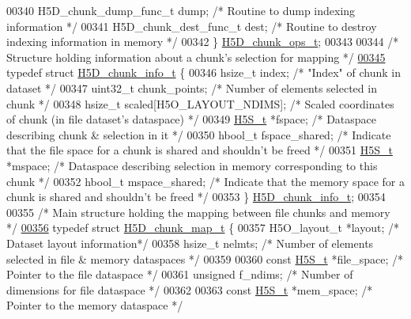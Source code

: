 \begin{DoxyCode}
00340     H5D\_chunk\_dump\_func\_t dump;             \textcolor{comment}{/* Routine to dump indexing information */}
00341     H5D\_chunk\_dest\_func\_t dest;             \textcolor{comment}{/* Routine to destroy indexing information in memory */}
00342 \} \hyperlink{struct_h5_d__chunk__ops__t}{H5D\_chunk\_ops\_t};
00343 
00344 \textcolor{comment}{/* Structure holding information about a chunk's selection for mapping */}
\hyperlink{struct_h5_d__chunk__info__t}{00345} \textcolor{keyword}{typedef} \textcolor{keyword}{struct }\hyperlink{struct_h5_d__chunk__info__t}{H5D\_chunk\_info\_t} \{
00346     hsize\_t index;              \textcolor{comment}{/* "Index" of chunk in dataset */}
00347     uint32\_t chunk\_points;      \textcolor{comment}{/* Number of elements selected in chunk */}
00348     hsize\_t scaled[H5O\_LAYOUT\_NDIMS];   \textcolor{comment}{/* Scaled coordinates of chunk (in file dataset's dataspace) */}
00349     \hyperlink{struct_h5_s__t}{H5S\_t} *fspace;              \textcolor{comment}{/* Dataspace describing chunk & selection in it */}
00350     hbool\_t fspace\_shared;      \textcolor{comment}{/* Indicate that the file space for a chunk is shared and shouldn't be
       freed */}
00351     \hyperlink{struct_h5_s__t}{H5S\_t} *mspace;              \textcolor{comment}{/* Dataspace describing selection in memory corresponding to this
       chunk */}
00352     hbool\_t mspace\_shared;      \textcolor{comment}{/* Indicate that the memory space for a chunk is shared and shouldn't be
       freed */}
00353 \} \hyperlink{struct_h5_d__chunk__info__t}{H5D\_chunk\_info\_t};
00354 
00355 \textcolor{comment}{/* Main structure holding the mapping between file chunks and memory */}
\hyperlink{struct_h5_d__chunk__map__t}{00356} \textcolor{keyword}{typedef} \textcolor{keyword}{struct }\hyperlink{struct_h5_d__chunk__map__t}{H5D\_chunk\_map\_t} \{
00357     H5O\_layout\_t *layout;       \textcolor{comment}{/* Dataset layout information*/}
00358     hsize\_t nelmts;             \textcolor{comment}{/* Number of elements selected in file & memory dataspaces */}
00359 
00360     \textcolor{keyword}{const} \hyperlink{struct_h5_s__t}{H5S\_t} *file\_space;    \textcolor{comment}{/* Pointer to the file dataspace */}
00361     \textcolor{keywordtype}{unsigned} f\_ndims;           \textcolor{comment}{/* Number of dimensions for file dataspace */}
00362 
00363     \textcolor{keyword}{const} \hyperlink{struct_h5_s__t}{H5S\_t} *mem\_space;     \textcolor{comment}{/* Pointer to the memory dataspace */}

\end{DoxyCode}
